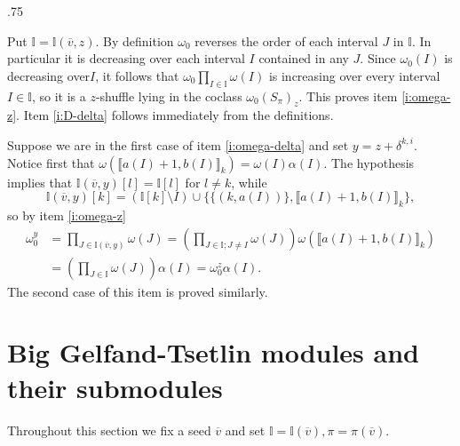 \documentclass[11pt,fleqn]{amsart}
\makeatletter
\renewcommand\proofname{Proof}
\renewenvironment{proof}[1][\textit{\proofname}]{\par
 \pushQED{\qed}%
 \normalfont \topsep.75\paraskip\relax
 \trivlist
 \item[\hskip\labelsep
 \itshape
 #1\@addpunct{.}]\ignorespaces
}{%
 \popQED\endtrivlist\@endpefalse
}
\newcounter{para}[section]
\newcommand\vv{\overline{v}}
\newcommand\II{\mathbb I}
\newcommand\interval[1]{\llbracket #1 \rrbracket}
\makeatother
\begin{document}
\begin{proof}
Put $\II = \II(\vv,z)$.
By definition $\omega_0$ reverses the order of each interval $J$ in $\II$. In
particular it is decreasing over each interval $I$ contained in any $J$. Since 
$\omega_0(I)$ is decreasing over$I$, it follows that $\omega_0 \prod_{I \in 
\II} \omega(I)$ is increasing over every interval $I \in \II$, so it is a 
$z$-shuffle lying in the coclass $\omega_0 (S_\pi)_z$. This proves item 
\ref{i:omega-z}. Item \ref{i:D-delta} follows immediately from the 
definitions. 

Suppose we are in the first case of item \ref{i:omega-delta} and set $y = z + 
\delta^{k,i}$. Notice first that $\omega(\interval{a(I)+1,b(I)}_k) = 
\omega(I) \alpha(I)$. The hypothesis implies that $\II(\vv,y)[l] = \II[l]$ for 
$l \neq k$, while 
\[
\II(\vv,y)[k] = (\II[k] \setminus I) \cup \{\{(k,a(I))\},
\interval{a(I)+1,b(I)}_k\},
\] 
so by item \ref{i:omega-z}
\begin{align*}
\omega_0^y 
	&= \prod_{J \in \II(\vv,y)} \omega(J)
	= \left(\prod_{J \in \II; J \neq I} \omega(J)\right) 
		\omega(\interval{a(I)+1,b(I)}_k) \\
	&= \left(\prod_{J \in \II} \omega(J)\right)\alpha(I)
	= \omega_0^z \alpha(I).
\end{align*}
The second case of this item is proved similarly.
\end{proof}

\section{Big Gelfand-Tsetlin modules and their submodules}
Throughout this section we fix a seed $\vv$ and set $\II = \II(\vv), \pi = 
\pi(\vv)$.
\end{document}
